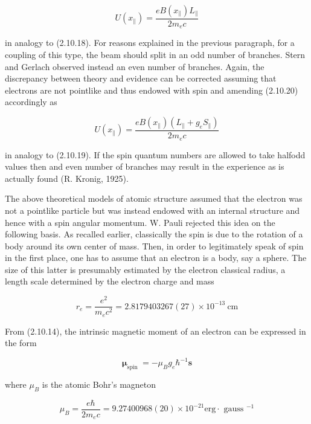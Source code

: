 \documentclass{article}
\begin{document}
\begin{equation*}
U\left(x_{\|}\right)=\frac{e B\left(x_{\|}\right) L_{\|}}{2 m_{e} c} \tag{2.10.20}
\end{equation*}
 
in analogy to (2.10.18). For reasons explained in the previous paragraph, for a
coupling of this type, the beam should split in an odd number of branches. Stern and Gerlach observed instead an even number of branches. Again, the discrepancy between theory and evidence can be corrected assuming that electrons are not pointlike and thus endowed with spin and amending (2.10.20) accordingly as
 
\begin{equation*}
U\left(x_{\|}\right)=\frac{e B\left(x_{\|}\right)\left(L_{\|}+g_{e} S_{\|}\right)}{2 m_{e} c} \tag{2.10.21}
\end{equation*}
 
in analogy to (2.10.19). If the spin quantum numbers are allowed to take halfodd values then and even number of branches may result in the experience as is actually found (R. Kronig, 1925).

The above theoretical models of atomic structure assumed that the electron was not a pointlike particle but was instead endowed with an internal structure and hence with a spin angular momentum. W. Pauli rejected this idea on the following basis. As recalled earlier, classically the spin is due to the rotation of a body around its own center of mass. Then, in order to legitimately speak of spin in the first place, one has to assume that an electron is a body, say a sphere. The size of this latter is presumably estimated by the electron classical radius, a length scale determined by the electron charge and mass
 
\begin{equation*}
r_{e}=\frac{e^{2}}{m_{e} c^{2}}=2.8179403267(27) \times 10^{-13} \mathrm{~cm} \tag{2.10.22}
\end{equation*}
 

From (2.10.14), the intrinsic magnetic moment of an electron can be expressed in the form
 
\begin{equation*}
\boldsymbol{\mu}_{\text {spin }}=-\mu_{B} g_{e} \hbar^{-1} \boldsymbol{s} \tag{2.10.23}
\end{equation*}
 
where $\mu_{B}$ is the atomic Bohr's magneton
 
\begin{equation*}
\mu_{B}=\frac{e \hbar}{2 m_{e} c}=9.27400968(20) \times 10^{-21} \mathrm{erg} \cdot \text { gauss }^{-1} \tag{2.10.24}
\end{equation*}
 
\end{document}
